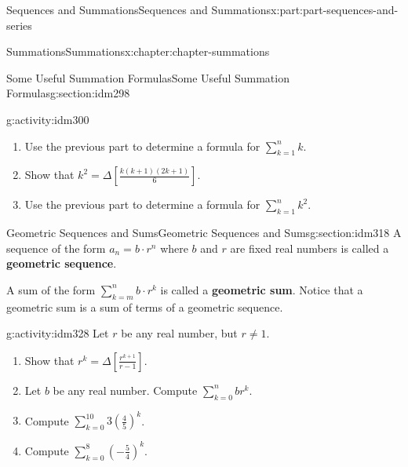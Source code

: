 \documentclass[oneside,10pt,]{book}
\newcommand{\terminology}[1]{\textbf{#1}}
\numberwithin{equation}{section}
\begin{document}
\begin{partptx}{Sequences and Summations}{}{Sequences and Summations}{}{}{x:part:part-sequences-and-series}
\begin{chapterptx}{Summations}{}{Summations}{}{}{x:chapter:chapter-summations}
\begin{sectionptx}{Some Useful Summation Formulas}{}{Some Useful Summation Formulas}{}{}{g:section:idm298}
\begin{activity}{}{g:activity:idm300}
\begin{enumerate}[font=\bfseries,label=(\alph*),ref=\alph*]
\item{}Use the previous part to determine a formula for \(\displaystyle\sum_{k=1}^n k\).%
\item{}Show that \(k^2 = \Delta \left[ \frac{k(k+1)(2k+1)}{6}\right]\).%
\item{}Use the previous part to determine a formula for \(\displaystyle\sum_{k=1}^n k^2\).%
\end{enumerate}
\end{activity}
\end{sectionptx}
%
%
\typeout{************************************************}
\typeout{************************************************}
%
\begin{sectionptx}{Geometric Sequences and Sums}{}{Geometric Sequences and Sums}{}{}{g:section:idm318}
A sequence of the form \(a_n = b\cdot r^n\) where \(b\) and \(r\) are fixed real numbers is called a \terminology{geometric sequence}.%
\par
A sum of the form \(\displaystyle\sum_{k=m}^n b\cdot r^k\) is called a \terminology{geometric sum}. Notice that a geometric sum is a sum of terms of a geometric sequence.%
\begin{activity}{}{g:activity:idm328}%
Let \(r\) be any real number, but \(r \neq 1\).%
\begin{enumerate}[font=\bfseries,label=(\alph*),ref=\alph*]
\item{}Show that \(\displaystyle r^k = \Delta \left[\frac{r^{k+1}}{r-1}\right]\).%
\item{}Let \(b\) be any real number. Compute \(\displaystyle\sum_{k=0}^n b r^k\).%
\item{}Compute \(\displaystyle\sum_{k=0}^{10} 3 \left(\frac{4}{5}\right)^k\).%
\item{}Compute \(\displaystyle\sum_{k=0}^8  \left(-\frac{5}{4}\right)^k\).%
\end{enumerate}
\end{activity}
\end{sectionptx}
\end{chapterptx}
\end{partptx}
%
%
\typeout{************************************************}
\typeout{************************************************}
%
\end{document}
